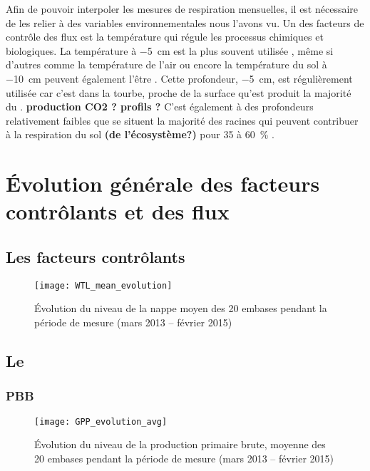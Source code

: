 Afin de pouvoir interpoler les mesures de respiration mensuelles, il est nécessaire de les relier à des variables environnementales nous l'avons vu.
Un des facteurs de contrôle des flux est la température qui régule les processus chimiques et biologiques.
La température à \SI{-5}{\cm} est la plus souvent utilisée \cite{ballantyne2014}, même si d'autres comme la température de l'air ou encore la température du sol à \SI{-10}{\cm} peuvent également l'être \cite{bortoluzzi2006,kim1992}.
Cette profondeur, \SI{-5}{\cm}, est régulièrement utilisée car c'est dans la tourbe, proche de la surface qu'est produit la majorité du \coo.
\textbf{production CO2 ? profils ?}
C'est également à des profondeurs relativement faibles que se situent la majorité des racines \plop qui peuvent contribuer à la respiration du sol \textbf{(de l'écosystème?)} pour 35 à \SI{60}{\percent} \cite{silvola1996a,crow2005}.

\section{Évolution générale des facteurs contrôlants et des flux}

\subsection{Les facteurs contrôlants}

\begin{figure}
\centering
\texttt{[image: WTL\_mean\_evolution]}
\caption{Évolution du niveau de la nappe moyen des 20 embases pendant la période de mesure (mars 2013 -- février 2015)}
\label{fig:WTL_mean_evolution}
\end{figure}

\subsection{Le \coo}

\subsubsection{PBB}

\begin{figure}
\centering
\texttt{[image: GPP\_evolution\_avg]}
\caption{Évolution du niveau de la production primaire brute, moyenne des 20 embases pendant la période de mesure (mars 2013 -- février 2015)}
\label{fig:GPP_evolution_avg}
\end{figure}


